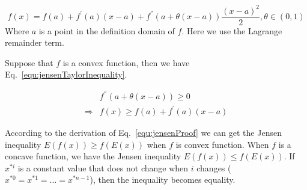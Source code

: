 \documentclass[runningheads,openany]{xhlPaper}
\begin{document}
\begin{equation}
\label{equ:jensenTaylor}
f\left( x \right) = f\left( a \right) + {f^{'}}\left( a \right)\left( {x - a} \right) + {f^{''}}\left( {a + \theta \left( {x - a} \right)} \right)\frac{{{{\left( {x - a} \right)}^2}}}{2},\theta  \in \left( {0,1} \right)
\end{equation}
Where $a$ is a point in the definition domain of $f$. Here we use the Lagrange remainder term.

Suppose that $f$ is a convex function, then we have Eq.~\ref{equ:jensenTaylorInequality}.

\begin{equation}
\label{equ:jensenTaylorInequality}
\begin{aligned}
&{f^{''}}\left( {a + \theta \left( {x - a} \right)} \right) \ge 0\\
 \Rightarrow& f\left( x \right) \ge f\left( a \right) + {f^{'}}\left( a \right)\left( {x - a} \right)
\end{aligned}
\end{equation}

According to the derivation of Eq.~\ref{equ:jensenProof} we can get the Jensen inequality $E\left( {f\left( x \right)} \right) \ge f\left( {E\left( x \right)} \right)$ when $f$ is convex function. 
When $f$ is a concave function, we have the Jensen inequality $E\left( {f\left( x \right)} \right) \le  f\left( {E\left( x \right)} \right)$. 
If $x^{*i}$ is a constant value that does not change when $i$ changes ($x^{*0} = x^{*1} = ... =x^{*n-1} $), then the inequality becomes equality.
\end{document}
